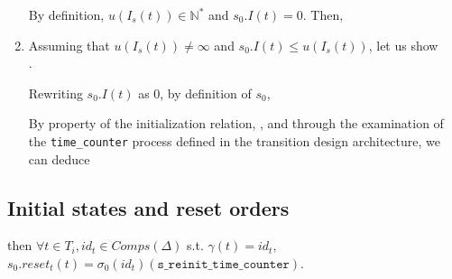 \documentclass[dvipsnames,12pt]{article}
\begin{document}
\begin{niproof}
\begin{enumerate}
    By definition, $u(I_s(t))\in\mathbb{N}^{*}$ and
    $s_0.I(t)=0$. Then, 
    
  \item Assuming that $u(I_s(t))\neq\infty$ and
    $s_0.I(t)\le{}u(I_s(t))$, let us
    show\\ .
 
    Rewriting $s_0.I(t)$ as $0$, by definition of $s_0$,

    By property of the \hvhdl{} initialization relation, \InCsCompT,
    and through the examination of the \texttt{time\_counter} process
    defined in the transition design architecture, we can deduce
  \end{enumerate}
\end{niproof}

\subsection{Initial states and reset orders}
\label{sec:init-states-rorders}

\begin{lemma}
  \label{lem:init-states-eq-rorders}
  \inithyps{} then $\forall{}t\in{}T_i,id_t\in{}Comps(\Delta)$
  s.t. $\gamma(t)=id_t$,
  $s_0.reset_t(t)=\sigma_0(id_t)(\texttt{s\_reinit\_time\_counter})$.
\end{lemma}
\end{document}
